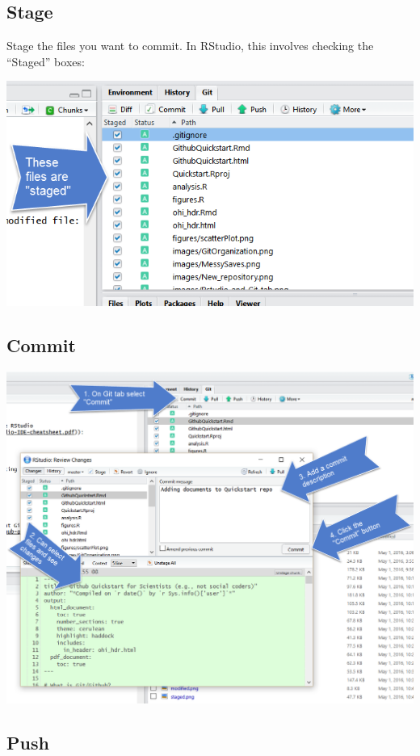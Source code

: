 \documentclass[]{book}
\begin{document}
\hypertarget{stage}{%
\subsection{Stage}\label{stage}}

Stage the files you want to commit. In RStudio, this involves checking the ``Staged'' boxes:

\includegraphics{img/staged.png}

\hypertarget{commit}{%
\subsection{Commit}\label{commit}}

\includegraphics{img/commit.png}

\hypertarget{push}{%
\subsection{Push}\label{push}}
\end{document}

